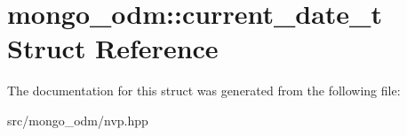 \hypertarget{structmongo__odm_1_1current__date__t}{}\section{mongo\+\_\+odm\+:\+:current\+\_\+date\+\_\+t Struct Reference}
\label{structmongo__odm_1_1current__date__t}


The documentation for this struct was generated from the following file\+:\begin{DoxyCompactItemize}
\item 
src/mongo\+\_\+odm/nvp.\+hpp\end{DoxyCompactItemize}
